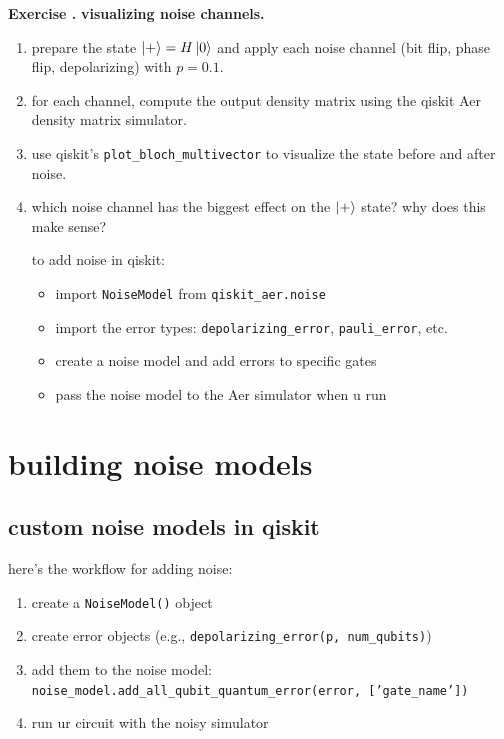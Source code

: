 \documentclass[11pt,a4paper]{article}
\theoremstyle{definition}
\theoremstyle{remark}
\newcounter{exercise}[section]
\newenvironment{exercise}{\refstepcounter{exercise}\par\medskip\noindent\textbf{Exercise \theexercise.}\rmfamily}{\medskip}
\begin{document}
\begin{exercise}
\textbf{visualizing noise channels.}
\begin{enumerate}[leftmargin=*]
  \item prepare the state $\ket{+} = H\ket{0}$ and apply each noise channel (bit flip, phase flip, depolarizing) with $p = 0.1$.
  \item for each channel, compute the output density matrix using the qiskit Aer density matrix simulator.
  \item use qiskit's \texttt{plot\_bloch\_multivector} to visualize the state before and after noise.
  \item which noise channel has the biggest effect on the $\ket{+}$ state? why does this make sense?

  to add noise in qiskit:
  \begin{itemize}[leftmargin=*]
    \item import \texttt{NoiseModel} from \texttt{qiskit\_aer.noise}
    \item import the error types: \texttt{depolarizing\_error}, \texttt{pauli\_error}, etc.
    \item create a noise model and add errors to specific gates
    \item pass the noise model to the Aer simulator when u run
  \end{itemize}
\end{enumerate}
\end{exercise}

\section{building noise models}

\subsection{custom noise models in qiskit}

here's the workflow for adding noise:
\begin{enumerate}[leftmargin=*]
  \item create a \texttt{NoiseModel()} object
  \item create error objects (e.g., \texttt{depolarizing\_error(p, num\_qubits)})
  \item add them to the noise model: \texttt{noise\_model.add\_all\_qubit\_quantum\_error(error, ['gate\_name'])}
  \item run ur circuit with the noisy simulator
\end{enumerate}
\end{document}
